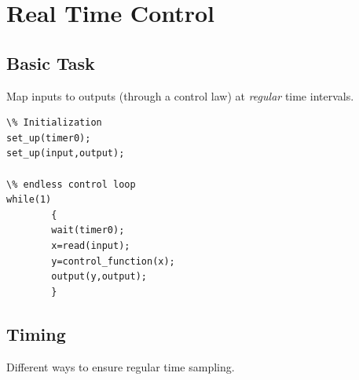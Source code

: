 \section{Real Time Control }

\subsection{Basic Task}
Map inputs to outputs (through a control law) at
{\it regular } time intervals.



\begin{verbatim}
\% Initialization
set_up(timer0);
set_up(input,output);

\% endless control loop
while(1)
        {
        wait(timer0);
        x=read(input);
        y=control_function(x);
        output(y,output);
        }
\end{verbatim}


\subsection{Timing}
Different ways to ensure regular time sampling.


